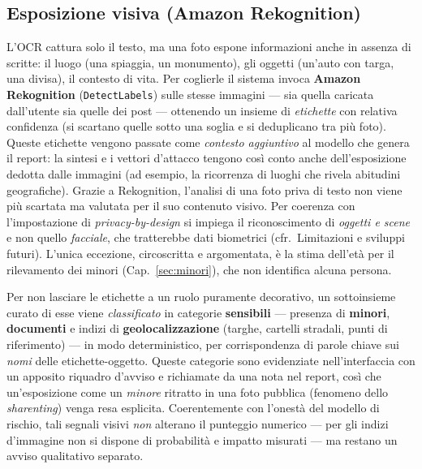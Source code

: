 \documentclass[11pt,a4paper]{article}
\begin{document}
\subsection{Esposizione visiva (Amazon Rekognition)} L'OCR cattura solo il testo, ma una
foto espone informazioni anche in assenza di scritte: il luogo (una spiaggia, un
monumento), gli oggetti (un'auto con targa, una divisa), il contesto di vita. Per
coglierle il sistema invoca \textbf{Amazon Rekognition} (\texttt{DetectLabels}) sulle
stesse immagini --- sia quella caricata dall'utente sia quelle dei post --- ottenendo un
insieme di \emph{etichette} con relativa confidenza (si scartano quelle sotto una soglia
e si deduplicano tra più foto). Queste etichette vengono passate come \emph{contesto
aggiuntivo} al modello che genera il report: la sintesi e i vettori d'attacco tengono
così conto anche dell'esposizione dedotta dalle immagini (ad esempio, la ricorrenza di
luoghi che rivela abitudini geografiche). Grazie a Rekognition, l'analisi di una foto
priva di testo non viene più scartata ma valutata per il suo contenuto visivo. Per
coerenza con l'impostazione di \emph{privacy-by-design} si impiega il riconoscimento di
\emph{oggetti e scene} e non quello \emph{facciale}, che tratterebbe dati biometrici
(cfr.\ Limitazioni e sviluppi futuri). L'unica eccezione, circoscritta e argomentata, è la
stima dell'età per il rilevamento dei minori (Cap.~\ref{sec:minori}), che non identifica
alcuna persona.

Per non lasciare le etichette a un ruolo puramente decorativo, un sottoinsieme curato di
esse viene \emph{classificato} in categorie \textbf{sensibili} --- presenza di
\textbf{minori}, \textbf{documenti} e indizi di \textbf{geolocalizzazione} (targhe,
cartelli stradali, punti di riferimento) --- in modo deterministico, per corrispondenza
di parole chiave sui \emph{nomi} delle etichette-oggetto.
Queste categorie sono evidenziate nell'interfaccia con un apposito riquadro d'avviso e
richiamate da una nota nel report, così che un'esposizione come un \emph{minore} ritratto
in una foto pubblica (fenomeno dello \emph{sharenting}) venga resa esplicita. Coerentemente
con l'onestà del modello di rischio, tali segnali visivi \emph{non} alterano il punteggio
numerico --- per gli indizi d'immagine non si dispone di probabilità e impatto misurati ---
ma restano un avviso qualitativo separato.
\end{document}
